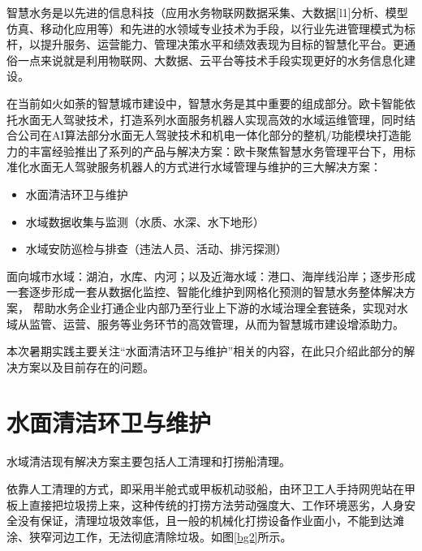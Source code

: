 \documentclass[cn,12pt,color=mine,scheme=chinese,bibstyle=gb7714-2015]{elegantbook}
\begin{document}
智慧水务是以先进的信息科技（应用水务物联网数据采集、大数据[l1]分析、模型仿真、移动化应用等）和先进的水领域专业技术为手段，以行业先进管理模式为标杆，以提升服务、运营能力、管理决策水平和绩效表现为目标的智慧化平台。更通俗一点来说就是利用物联网、大数据、云平台等技术手段实现更好的水务信息化建设。

在当前如火如荼的智慧城市建设中，智慧水务是其中重要的组成部分。欧卡智能\cite{orca}依托水面无人驾驶技术，打造系列水面服务机器人实现高效的水域运维管理，同时结合公司在AI算法部分水面无人驾驶技术和机电一体化部分的整机/功能模块打造能力的丰富经验推出了系列的产品与解决方案：欧卡聚焦智慧水务管理平台下，用标准化水面无人驾驶服务机器人的方式进行水域管理与维护的三大解决方案：

\begin{itemize}
	\item 水面清洁环卫与维护
	\item 水域数据收集与监测（水质、水深、水下地形）
	\item 水域安防巡检与排查（违法人员、活动、排污探测）
\end{itemize}

面向城市水域：湖泊，水库、内河；以及近海水域：港口、海岸线沿岸；逐步形成一套逐步形成一套从数据化监控、智能化维护到网格化预测的智慧水务整体解决方案， 帮助水务企业打通企业内部乃至行业上下游的水域治理全套链条，实现对水域从监管、运营、服务等业务环节的高效管理，从而为智慧城市建设增添助力。

本次暑期实践主要关注“水面清洁环卫与维护”相关的内容，在此只介绍此部分的解决方案以及目前存在的问题。

\section{水面清洁环卫与维护}
水域清洁现有解决方案主要包括人工清理和打捞船清理。

\begin{note}[人工清理]
	依靠人工清理的方式，即采用半舱式或甲板机动驳船，由环卫工人手持网兜站在甲板上直接把垃圾捞上来，这种传统的打捞方法劳动强度大、工作环境恶劣，人身安全没有保证，清理垃圾效率低，且一般的机械化打捞设备作业面小，不能到达滩涂、狭窄河边工作，无法彻底清除垃圾。如图\ref{bg2}所示。
\end{note}
\end{document}
